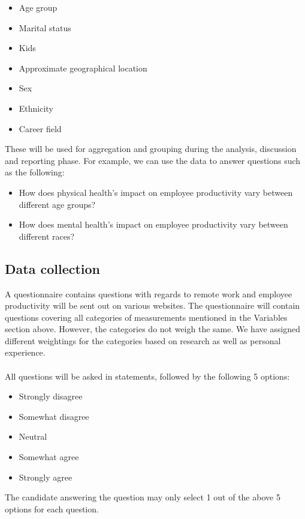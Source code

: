 \documentclass[12pt]{article}
\begin{document}
\begin{itemize}
  \item Age group 
  \item Marital status
  \item Kids
  \item Approximate geographical location
  \item Sex
  \item Ethnicity
  \item Career field
\end{itemize}
These will be used for aggregation and grouping during the analysis, discussion and reporting phase. For example, we can use the data to answer questions such as the following:
\begin{itemize}
  \item How does physical health’s impact on employee productivity vary between different age groups?
  \item How does mental health’s impact on employee productivity vary between different races?
\end{itemize}


\subsection*{Data collection}

A questionnaire contains questions with regards to remote work and employee productivity will be sent out on various websites. The questionnaire will contain questions covering all categories of measurements mentioned in the Variables section above. However, the categories do not weigh the same. We have assigned different weightings for the categories based on research as well as personal experience. \\ \\
All questions will be asked in statements, followed by the following 5 options: 
\begin{itemize}
  \item Strongly disagree
  \item Somewhat disagree
  \item Neutral
  \item Somewhat agree
  \item Strongly agree
\end{itemize}
The candidate answering the question may only select 1 out of the above 5 options for each question. \\
\end{document}
